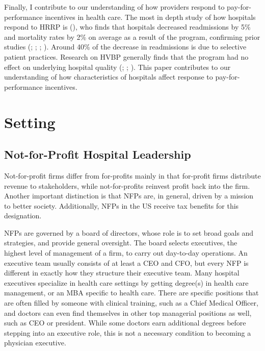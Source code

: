 \documentclass[12pt]{article}
\begin{document}
    Finally, I contribute to our understanding of how providers respond to pay-for-performance incentives in health care. The most in depth study of how hospitals respond to HRRP is \citeauthor{gupta2021impacts} (\citeyear{gupta2021impacts}), who finds that hospitals decreased readmissions by 5\% and mortality rates by 2\% on average as a result of the program, confirming prior studies (\cite{mellor2017does}; \cite{ziedan2018essays}; \cite{ody2019decreases}; \cite{gupta2021impacts}). Around 40\% of the decrease in readmissions is due to selective patient practices. Research on HVBP generally finds that the program had no effect on underlying hospital quality (\cite{us2015hospital}; \cite{norton2018moneyball}; \cite{friedson2019so}). This paper contributes to our understanding of how characteristics of hospitals affect response to pay-for-performance incentives. 

    

    \section{Setting}

    \subsection{Not-for-Profit Hospital Leadership}

    Not-for-profit firms differ from for-profits mainly in that for-profit firms distribute revenue to stakeholders, while not-for-profits reinvest profit back into the firm. Another important distinction is that NFPs are, in general, driven by a mission to better society. Additionally, NFPs in the US receive tax benefits for this designation. 
    
    NFPs are governed by a board of directors, whose role is to set broad goals and strategies, and provide general oversight. The board selects executives, the highest level of management of a firm, to carry out day-to-day operations. An executive team usually consists of at least a CEO and CFO, but every NFP is different in exactly how they structure their executive team. Many hospital executives specialize in health care settings by getting degree(s) in health care management, or an MBA specific to health care. There are specific positions that are often filled by someone with clinical training, such as a Chief Medical Officer, and doctors can even find themselves in other top managerial positions as well, such as CEO or president. While some doctors earn additional degrees before stepping into an executive role, this is not a necessary condition to becoming a physician executive. 
\end{document}
